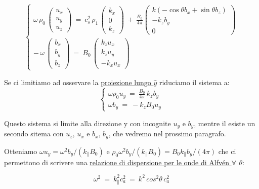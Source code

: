 \begin{equation}
	\label{eq:onde MHD}
	\begin{cases}
		\omega\, \rho_0\,
		\begin{pmatrix}
			u_x \\ u_y \\ u_z
		\end{pmatrix}  
		\ =\ 
		c^2_s\, \rho_1\,
		\begin{pmatrix}
			k_x\\ 0 \\ k_z
		\end{pmatrix}   
		\ +\ 
		\frac{B_0}{4\pi}
		\begin{pmatrix}
			k (-\cos\theta b_x + \sin\theta b_z)\\ -k_z b_y\\ 0
		\end{pmatrix} 
		\\
		-\,\omega\,
		\begin{pmatrix}
			b_x \\ b_y \\ b_z
		\end{pmatrix} 
		\ =\ B_0\,
		\begin{pmatrix}
			k_z u_x\\ k_z u_y\\ -k_x u_x
		\end{pmatrix}  
	\end{cases}
\end{equation} 

Se ci limitiamo ad osservare la \underline{proiezione lungo $\hat y$} riduciamo il sistema a:
\[\begin{cases}
	\omega \rho_0 u_y\ =\ \displaystyle\frac{B_0}{4\pi}\, k_z b_y\\
	\omega b_y\ =\ -k_z B_0 u_y
\end{cases}\]

Questo sistema si limite alla direzione y con incognite $u_y$ e $b_y$, mentre il esiste un secondo sitema con $u_z,\, u_x$ e $b_x,\, b_y$, che vedremo nel prossimo paragrafo. 

Otteniamo $\omega u_y = \omega^2 b_y / (k_\parallel B_0)$ e $\rho_0 \omega^2 b_y/(k_\parallel B_0) = B_0 k_\parallel b_y / (4\pi)$ che ci permettono di scrivere una \underline{relazione di dispersione per le onde di Alfvén $\forall\ \, \theta$}:

\begin{equation}
	\boxed{\ \omega^2\ =\ k^2_\parallel c^2_a\ =\ k^2\, cos^2\theta\, c^2_a\ }
\end{equation}

